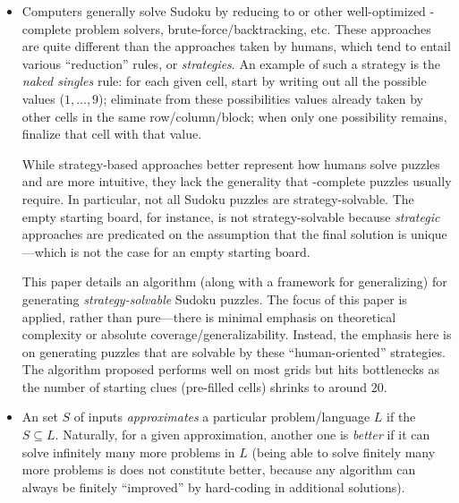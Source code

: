 \begin{itemize}
  \item {}

    \begin{annotation}
      Computers generally solve Sudoku by reducing to  or other
      well-optimized \NP-complete problem solvers, brute-force/backtracking,
      etc.  These approaches are quite different than the approaches taken by
      humans, which tend to entail various ``reduction'' rules, or
      \emph{strategies}.  An example of such a strategy is the \emph{naked
      singles} rule: for each given cell, start by writing out all the possible
      values (\(1, \dots, 9\)); eliminate from these possibilities values
      already taken by other cells in the same row/column/block; when only one
      possibility remains, finalize that cell with that value.

      While strategy-based approaches better represent how humans solve puzzles
      and are more intuitive, they lack the generality that \NP-complete puzzles
      usually require.  In particular, not all Sudoku puzzles are
      strategy-solvable.  The empty starting board, for instance, is not
      strategy-solvable because \emph{strategic} approaches are predicated on
      the assumption that the final solution is unique---which is not the case
      for an empty starting board.

      This paper details an algorithm (along with a framework for generalizing)
      for generating \emph{strategy-solvable} Sudoku puzzles.  The focus of
      this paper is applied, rather than pure---there is minimal emphasis on
      theoretical complexity or absolute coverage/generalizability.  Instead,
      the emphasis here is on generating puzzles that are solvable by these
      ``human-oriented'' strategies.  The algorithm proposed performs well on
      most grids but hits bottlenecks as the number of starting clues
      (pre-filled cells) shrinks to around \(20\).
    \end{annotation}

  \item {}

    \begin{annotation}
      An set \(S\) of inputs \emph{approximates} a particular problem/language
      \(L\) if the \(S \subseteq L\).  Naturally, for a given approximation,
      another one is \emph{better} if it can solve infinitely many more
      problems in \(L\) (being able to solve finitely many more problems is
      does not constitute better, because any algorithm can always be finitely
      ``improved'' by hard-coding in additional solutions).


\end{annotation}
\end{itemize}
